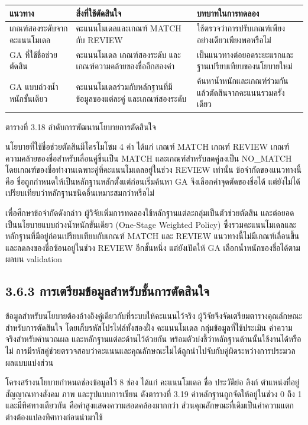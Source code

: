 \documentclass[12pt,a4paper]{report}
\begin{document}
\begin{center}\small
\begin{tabularx}{\linewidth}{p{3.4cm}XX}
\toprule
แนวทาง & สิ่งที่ใช้ตัดสินใจ & บทบาทในการทดลอง \\
\midrule
เกณฑ์สองระดับจากคะแนนโมเดล & คะแนนโมเดลและเกณฑ์ MATCH กับ REVIEW & ใช้ตรวจว่าการปรับเกณฑ์เพียงอย่างเดียวเพียงพอหรือไม่ \\
GA ที่ใช้ชื่อช่วยตัดสิน & คะแนนโมเดล เกณฑ์สองระดับ และเกณฑ์ความคล้ายของชื่ออีกสองค่า & เป็นแนวทางต่อยอดระยะแรกและฐานเปรียบเทียบของนโยบายใหม่ \\
GA แบบถ่วงน้ำหนักขั้นเดียว & คะแนนโมเดลร่วมกับหลักฐานที่มีข้อมูลของแต่ละคู่ และเกณฑ์สองระดับ & ค้นหาน้ำหนักและเกณฑ์ร่วมกัน แล้วตัดสินจากคะแนนรวมครั้งเดียว \\
\bottomrule
\end{tabularx}
\par ตารางที่ 3.18 ลำดับการพัฒนานโยบายการตัดสินใจ
\end{center}

นโยบายที่ใช้ชื่อช่วยตัดสินมีโครโมโซม 4 ค่า ได้แก่ เกณฑ์ MATCH เกณฑ์ REVIEW เกณฑ์ความคล้ายของชื่อสำหรับเลื่อนคู่ขึ้นเป็น MATCH และเกณฑ์สำหรับลดคู่ลงเป็น NO\_MATCH โดยเกณฑ์ของชื่อทำงานเฉพาะคู่ที่คะแนนโมเดลอยู่ในช่วง REVIEW เท่านั้น ข้อจำกัดของแนวทางนี้คือ ชื่อถูกกำหนดให้เป็นหลักฐานหลักตั้งแต่ก่อนเริ่มค้นหา GA จึงเลือกค่าจุดตัดของชื่อได้ แต่ยังไม่ได้เปรียบเทียบว่าหลักฐานชนิดอื่นเหมาะสมกว่าหรือไม่

เพื่อศึกษาข้อจำกัดดังกล่าว ผู้วิจัยเพิ่มการทดลองใช้หลักฐานแต่ละกลุ่มเป็นตัวช่วยตัดสิน และต่อยอดเป็นนโยบายแบบถ่วงน้ำหนักขั้นเดียว (One-Stage Weighted Policy) ซึ่งรวมคะแนนโมเดลและหลักฐานที่มีอยู่ก่อนเปรียบเทียบกับเกณฑ์ MATCH และ REVIEW แนวทางนี้ไม่มีเกณฑ์เลื่อนขึ้นและลดลงของชื่อซ้อนอยู่ในช่วง REVIEW อีกชั้นหนึ่ง แต่ยังเปิดให้ GA เลือกน้ำหนักของชื่อได้ตามผลบน validation

\subsection*{3.6.3 การเตรียมข้อมูลสำหรับชั้นการตัดสินใจ}
ข้อมูลสำหรับนโยบายต้องอ้างอิงคู่เดียวกับที่ระบบให้คะแนนไว้จริง ผู้วิจัยจึงจัดเตรียมตารางคุณลักษณะสำหรับการตัดสินใจ โดยเก็บรหัสโปรไฟล์ทั้งสองฝั่ง คะแนนโมเดล กลุ่มข้อมูลที่ใช้ประเมิน ค่าความจริงสำหรับคำนวณผล และหลักฐานแต่ละด้านไว้ด้วยกัน พร้อมตัวบ่งชี้ว่าหลักฐานด้านนั้นใช้งานได้หรือไม่ การมีรหัสคู่ช่วยตรวจสอบว่าคะแนนและคุณลักษณะไม่ได้ถูกนำไปจับกับคู่ผิดระหว่างการประมวลผลแบบแบ่งส่วน

โครงสร้างนโยบายกำหนดช่องข้อมูลไว้ 8 ช่อง ได้แก่ คะแนนโมเดล ชื่อ ประวัติย่อ ลิงก์ ตำแหน่งที่อยู่ สัญญาณทางสังคม ภาพ และรูปแบบการเขียน ดังตารางที่ 3.19 ค่าหลักฐานถูกจัดให้อยู่ในช่วง 0 ถึง 1 และมีทิศทางเดียวกัน คือค่าสูงแสดงความสอดคล้องมากกว่า ส่วนคุณลักษณะที่เดิมเป็นค่าความแตกต่างต้องแปลงทิศทางก่อนนำมาใช้
\end{document}
